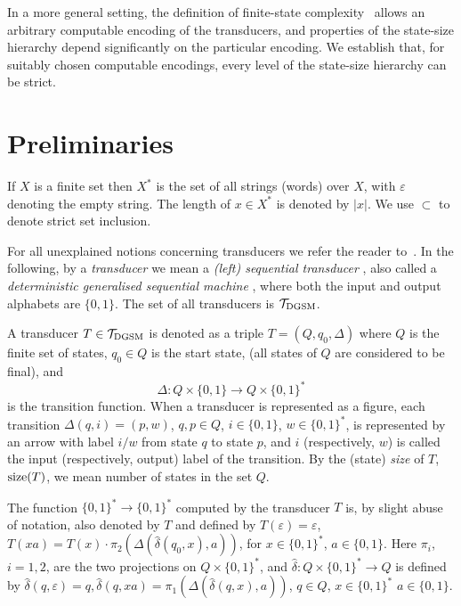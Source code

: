 \documentclass[copyright]{eptcs}
\begin{document}
In a more general setting,
the definition of finite-state complexity~\cite{CSR} allows
an arbitrary computable encoding of the transducers,
and properties of the state-size hierarchy
depend significantly on the particular encoding.
We establish that,  for
suitably chosen computable encodings,
every level of the state-size hierarchy can be strict.

\section{Preliminaries}
\label{prelim}

If $X$ is a finite set then $X^{*}$ is the set of all strings
(words) over $X$, with $\varepsilon$ denoting the empty string.
The length of  $x\in X^{*}$
is denoted by $|x|$.  We use $\subset$ to denote strict
set inclusion.

For all unexplained notions concerning transducers we
refer the reader to~\cite{Be,Yu}.
In the following, by a {\em transducer\/}
we mean a {\em (left) sequential
transducer\/} \cite{Be}, also called a {\em deterministic generalised
sequential machine\/}  \cite{Yu},
where both the input and output alphabets are $\{ 0, 1 \}$.
The set of all transducers is $\cal T_{\rm DGSM}$.

A transducer $T \in \cal T_{\rm DGSM}$ is denoted as
a triple $T = (Q, q_0, \Delta)$ where
$Q$
 is the finite set of states, $q_0 \in Q$ is the start state,
(all states of $Q$ are considered to be final),
and
\begin{equation}
\label{seqtrans}
\Delta : Q \times \{ 0, 1 \} \rightarrow Q \times \{ 0, 1 \}^*
\end{equation}
is the transition function. 
When a transducer is represented
as a figure, each transition $\Delta(q, i) = (p,w)$,
$q, p \in Q$, $i \in \{ 0, 1 \}$, $w \in \{ 0, 1 \}^*$, is
represented by an arrow with label $i / w$ from state $q$ to
state $p$, and $i$ (respectively, $w$) is called the input (respectively,
output) label of the transition. By the (state) {\em size\/} of $T$,
${\rm size}(T)$, we mean number   of states in the set $Q$.


The function $\{0,1\}^{*} \rightarrow \{0,1\}^{*}$ computed by
the transducer  $T$ is, by slight abuse of
notation, also denoted by $T$ and
defined by
$T(\varepsilon)= \varepsilon$,
$T(xa) = T(x) \cdot \pi_2(\Delta(\hat{\delta}(q_{0},x),a))$,
for
$x \in \{0,1\}^{*}$,
$a \in \{0,1\}$. Here $\pi_i$, $i = 1, 2$, are the
two projections on $Q \times \{ 0, 1 \}^*$,
and $\hat{\delta} :
Q \times \{ 0, 1 \}^*
\rightarrow  Q$ is defined by  $\hat{\delta} (q, \varepsilon)=q,
\hat{\delta} (q,xa) =
\pi_1(\Delta(\hat{\delta} (q,x),a))$, $q\in Q$, $x \in \{0,1\}^{*}$
$a \in \{ 0, 1 \}$.
\end{document}
